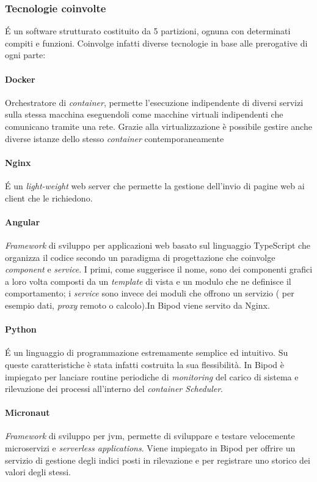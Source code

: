 \subsubsection{Tecnologie coinvolte}
\label{ssec:techEnvolved}
\'E un software strutturato costituito da 5 partizioni, ognuna con determinati compiti e funzioni. Coinvolge infatti diverse tecnologie in base alle prerogative di ogni parte:

\paragraph{Docker} Orchestratore di \textit{container}, permette l'esecuzione indipendente di diversi servizi sulla stessa macchina eseguendoli come macchine virtuali indipendenti che comunicano tramite una rete. Grazie alla virtualizzazione è possibile gestire anche diverse istanze dello stesso \textit{container} contemporaneamente

\paragraph{Nginx} \'E un \textit{light-weight} web server che permette la gestione dell'invio di pagine web ai client che le richiedono.

\paragraph{Angular} \textit{Framework} di sviluppo per applicazioni web basato sul linguaggio TypeScript che organizza il codice secondo un paradigma di progettazione che coinvolge \textit{component} e \textit{service}. I primi, come suggerisce il nome, sono dei componenti grafici a loro volta composti da un \textit{template} di vista e un modulo che ne definisce il comportamento; i \textit{service} sono invece dei moduli che offrono un servizio ( per esempio dati, \textit{proxy} remoto o calcolo).In Bipod viene servito da Nginx.

\paragraph{Python} \'E un linguaggio di programmazione estremamente semplice ed intuitivo. Su queste caratteristiche è stata infatti costruita la sua flessibilità. In Bipod è impiegato per lanciare routine periodiche di \textit{monitoring} del carico di sistema e rilevazione dei processi all'interno del \textit{container Scheduler}.

\paragraph{Micronaut} \textit{Framework} di sviluppo per \acrshort{jvm}\glsfirstoccur, permette di sviluppare e testare velocemente microservizi e \textit{serverless applications}. Viene impiegato in Bipod per offrire un servizio di gestione degli indici posti in rilevazione e per registrare uno storico dei valori degli stessi.

